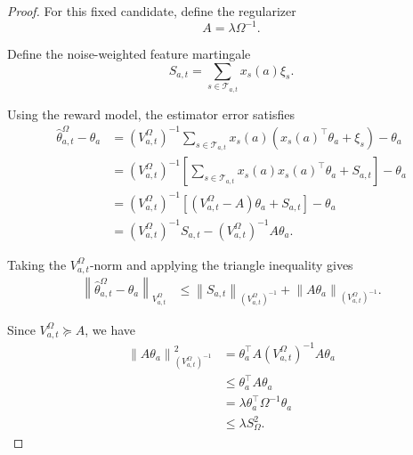 \documentclass{article} %
\begin{document}
\begin{proof}
For this fixed candidate, define the regularizer
\begin{equation}
\label{eq:hyper-sn-proof-A}
A=\lambda\Omega^{-1}.
\end{equation}

Define the noise-weighted feature martingale
\begin{equation}
\label{eq:hyper-sn-proof-S}
S_{a,t}
=
\sum_{s\in\mathcal{T}_{a,t}}
x_s(a)\xi_s .
\end{equation}

Using the reward model, the estimator error satisfies
\begin{align}
\label{eq:hyper-sn-proof-error}
\widehat{\theta}_{a,t}^{\Omega}-\theta_a
&=
\left(V_{a,t}^{\Omega}\right)^{-1}
\sum_{s\in\mathcal{T}_{a,t}}
x_s(a)
\left(x_s(a)^\top\theta_a+\xi_s\right)
-\theta_a
\\
&=
\left(V_{a,t}^{\Omega}\right)^{-1}
\left[
\sum_{s\in\mathcal{T}_{a,t}}
x_s(a)x_s(a)^\top\theta_a
+
S_{a,t}
\right]
-\theta_a
\\
&=
\left(V_{a,t}^{\Omega}\right)^{-1}
\left[
\left(V_{a,t}^{\Omega}-A\right)\theta_a
+
S_{a,t}
\right]
-\theta_a
\\
&=
\left(V_{a,t}^{\Omega}\right)^{-1}
S_{a,t}
-
\left(V_{a,t}^{\Omega}\right)^{-1}
A\theta_a .
\end{align}

Taking the \(V_{a,t}^{\Omega}\)-norm and applying the triangle inequality gives
\begin{align}
\label{eq:hyper-sn-proof-triangle}
\left\|
\widehat{\theta}_{a,t}^{\Omega}-\theta_a
\right\|_{V_{a,t}^{\Omega}}
&\le
\left\|
S_{a,t}
\right\|_{\left(V_{a,t}^{\Omega}\right)^{-1}}
+
\left\|
A\theta_a
\right\|_{\left(V_{a,t}^{\Omega}\right)^{-1}} .
\end{align}

Since \(V_{a,t}^{\Omega}\succeq A\), we have
\begin{align}
\label{eq:hyper-sn-proof-bias}
\left\|
A\theta_a
\right\|_{\left(V_{a,t}^{\Omega}\right)^{-1}}^2
&=
\theta_a^\top A
\left(V_{a,t}^{\Omega}\right)^{-1}
A\theta_a
\\
&\le
\theta_a^\top A\theta_a
\\
&=
\lambda\theta_a^\top\Omega^{-1}\theta_a
\\
&\le
\lambda S_{\Omega}^2 .
\end{align}


\end{proof}
\end{document}
